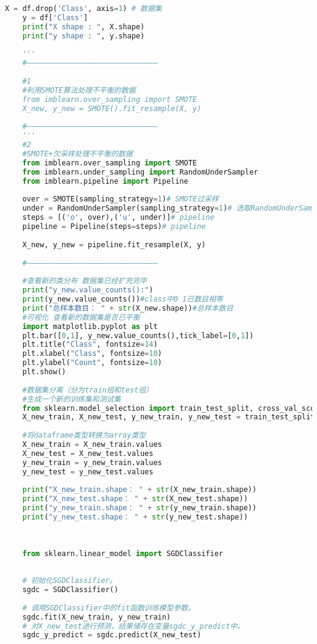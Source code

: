 \documentclass[a4paper,12pt]{article}
\begin{document}
\begin{lstlisting}[language=python, breaklines]
	X = df.drop('Class', axis=1) # 数据集
	y = df['Class']
	print("X shape : ", X.shape)
	print("y shape : ", y.shape)
	
	'''
	#——————————————————————————————
	
	#1
	#利用SMOTE算法处理不平衡的数据
	from imblearn.over_sampling import SMOTE
	X_new, y_new = SMOTE().fit_resample(X, y)
	
	#——————————————————————————————
	'''
	#2
	#SMOTE+欠采样处理不平衡的数据
	from imblearn.over_sampling import SMOTE
	from imblearn.under_sampling import RandomUnderSampler
	from imblearn.pipeline import Pipeline
	
	over = SMOTE(sampling_strategy=1)# SMOTE过采样
	under = RandomUnderSampler(sampling_strategy=1)# 选取RandomUnderSampler函数进行欠采样
	steps = [('o', over),('u', under)]# pipeline
	pipeline = Pipeline(steps=steps)# pipeline
	
	X_new, y_new = pipeline.fit_resample(X, y)
	
	#——————————————————————————————
	
	#查看新的类分布 数据集已经扩充完毕
	print("y_new.value_counts():")
	print(y_new.value_counts())#class中0 1已数目相等
	print("总样本数目： " + str(X_new.shape))#总样本数目
	#可视化 查看新的数据集是否已平衡
	import matplotlib.pyplot as plt
	plt.bar([0,1], y_new.value_counts(),tick_label=[0,1])
	plt.title("Class", fontsize=14)
	plt.xlabel("Class", fontsize=10)
	plt.ylabel("Count", fontsize=10)
	plt.show()
	
	#数据集分离（分为train组和test组）
	#生成一个新的训练集和测试集
	from sklearn.model_selection import train_test_split, cross_val_score, GridSearchCV
	X_new_train, X_new_test, y_new_train, y_new_test = train_test_split(X_new, y_new, test_size=0.33, random_state=666)#设置test比例为0.33
	
	#将dataframe类型转换为array类型
	X_new_train = X_new_train.values
	X_new_test = X_new_test.values
	y_new_train = y_new_train.values
	y_new_test = y_new_test.values
	
	print("X_new_train.shape： " + str(X_new_train.shape))
	print("X_new_test.shape： " + str(X_new_test.shape))
	print("y_new_train.shape： " + str(y_new_train.shape))
	print("y_new_test.shape： " + str(y_new_test.shape))
	
	
	
	from sklearn.linear_model import SGDClassifier
	
	
	# 初始化SGDClassifier。
	sgdc = SGDClassifier()
	
	# 调用SGDClassifier中的fit函数训练模型参数。
	sgdc.fit(X_new_train, y_new_train)
	# 对X_new_test进行预测，结果储存在变量sgdc_y_predict中。
	sgdc_y_predict = sgdc.predict(X_new_test)
	

\end{lstlisting}
\end{document}
